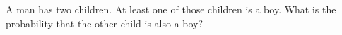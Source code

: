 \documentclass[table]{ximera}
\begin{document}
\begin{question}
A man has two children. At least one of those children is a boy. What is the probability that the other child is also a boy?
  \begin{solution}
    \begin{multiple-choice}
    \end{multiple-choice}
  \end{solution}
\end{question}
\end{document}
